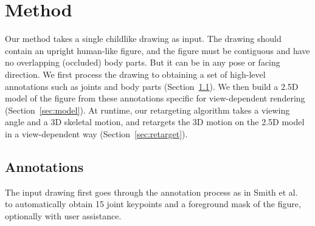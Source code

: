 \section{Method}
Our method takes a single childlike drawing as input. The drawing should contain an upright human-like figure, and the figure must be contiguous and have no overlapping (occluded) body parts. But it can be in any pose or facing direction. 
We first process the drawing to obtaining a set of high-level annotations such as joints and body parts (Section~\ref{sec:annotation}). We then build a 2.5D model of the figure from these annotations specific for view-dependent rendering (Section~\ref{sec:model}). At runtime, our retargeting algorithm takes a viewing angle and a 3D skeletal motion, and retargets the 3D motion on the 2.5D model in a view-dependent way (Section~\ref{sec:retarget}).




\subsection{Annotations}
\label{sec:annotation}
The input drawing first goes through the annotation process as in Smith et al.~\cite{SmithHodgins} to automatically obtain 15 joint keypoints and a foreground mask of the figure, optionally with user assistance.

